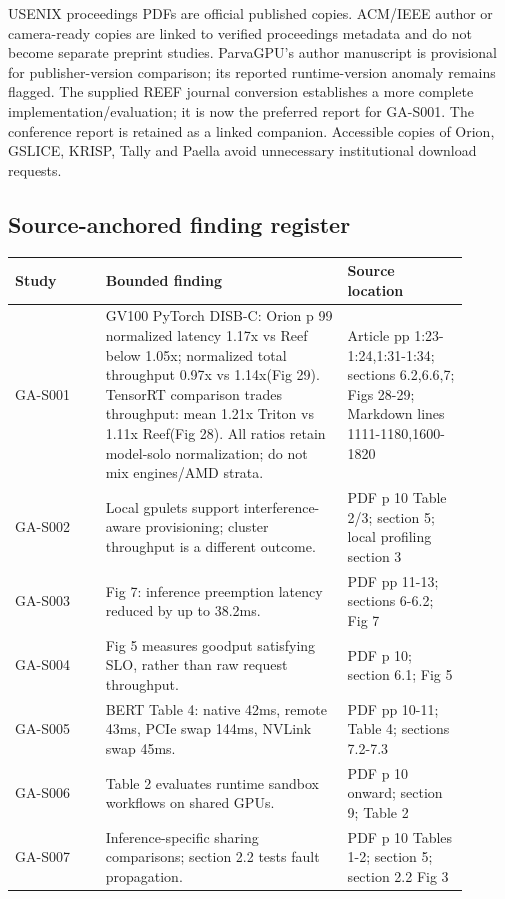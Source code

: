 \documentclass[12pt,a4paper]{article}
\begin{document}
USENIX proceedings PDFs are official published copies. ACM/IEEE author or camera-ready copies are linked to verified proceedings metadata and do not become separate preprint studies. ParvaGPU's author manuscript is provisional for publisher-version comparison; its reported runtime-version anomaly remains flagged. The supplied REEF journal conversion establishes a more complete implementation/evaluation; it is now the preferred report for GA-S001. The conference report is retained as a linked companion. Accessible copies of Orion, GSLICE, KRISP, Tally and Paella avoid unnecessary institutional download requests.

\subsection{Source-anchored finding register}\begin{longtable}{P{0.18\linewidth}P{0.48\linewidth}P{0.24\linewidth}}\toprule Study & Bounded finding & Source location\\\midrule\endhead
GA-S001 \cite{reef} & GV100 PyTorch DISB-C: Orion p 99 normalized latency 1.17x vs Reef below 1.05x; normalized total throughput 0.97x vs 1.14x(Fig 29). TensorRT comparison trades throughput: mean 1.21x Triton vs 1.11x Reef(Fig 28). All ratios retain model-solo normalization; do not mix engines/AMD strata. & Article pp 1:23-1:24,1:31-1:34; sections 6.2,6.6,7; Figs 28-29; Markdown lines 1111-1180,1600-1820\\
GA-S002 \cite{gpulet} & Local gpulets support interference-aware provisioning; cluster throughput is a different outcome. & PDF p 10 Table 2/3; section 5; local profiling section 3\\
GA-S003 \cite{pipeswitch} & Fig 7: inference preemption latency reduced by up to 38.2ms. & PDF pp 11-13; sections 6-6.2; Fig 7\\
GA-S004 \cite{clockwork} & Fig 5 measures goodput satisfying SLO, rather than raw request throughput. & PDF p 10; section 6.1; Fig 5\\
GA-S005 \cite{torpor} & BERT Table 4: native 42ms, remote 43ms, PCIe swap 144ms, NVLink swap 45ms. & PDF pp 10-11; Table 4; sections 7.2-7.3\\
GA-S006 \cite{streambox} & Table 2 evaluates runtime sandbox workflows on shared GPUs. & PDF p 10 onward; section 9; Table 2\\
GA-S007 \cite{krypton} & Inference-specific sharing comparisons; section 2.2 tests fault propagation. & PDF p 10 Tables 1-2; section 5; section 2.2 Fig 3\\

\end{longtable}
\end{document}
